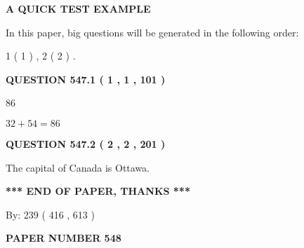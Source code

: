 \documentclass[12pt]{article}
\begin{document}
   
   
   
 \vspace{0.2in}
{\LARGE {\textbf{ A QUICK TEST EXAMPLE}}}
   
   
   
\vspace{0.2in}
   
In this paper, big questions will be generated in the following order: 
   
   
   1 ( 1 )
 ,
   2 ( 2 )
 .
  
\vspace{0.2in}
  
{\textbf{\Large{QUESTION
547.1 
 ( 1 , 1 , 101 )
}}}
  
  
 
 
\noindent{}

86
 
 
 
 
\noindent{}

$ %
32 +  %
54=   %
86$
 
 
  
\vspace{0.2in}
  
{\textbf{\Large{QUESTION
547.2 
 ( 2 , 2 , 201 )
}}}
  
  
 
 
\noindent{}
 
 
The capital of Canada is Ottawa.
 
 
 
 
   
   
 \vspace{0.2in}
 
   
   
   
   
\vspace{1.0in} 
{\textbf{\large{ *** END OF PAPER, THANKS *** }}} 
   
   
\hspace{1.0in} By: 
 239 ( 416 ,  613 )
   
   
   
   
\newpage 
\setcounter{page}{ 
   548001 } 
   
   
   
   
 {\textbf{ \Large{ PAPER NUMBER  548  }}}
   
\end{document}
